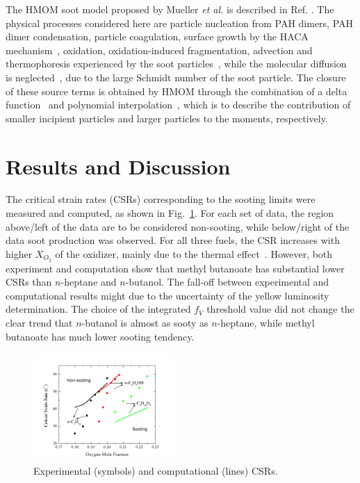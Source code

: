 \documentclass[preprint,3p,times,twocolumn]{elsarticleUS}
\begin{document}
The HMOM soot model proposed by Mueller \emph{et al.} is described in Ref. \cite{mueller09a,mueller09b,mueller11a}. The physical processes considered here are particle nucleation from PAH dimers, PAH dimer condensation, particle coagulation, surface growth by the HACA mechanism~\cite{frenklach02,frenklach91}, oxidation, oxidation-induced fragmentation, advection and thermophoresis experienced by the soot particles~\cite{waldmann66}, while the molecular diffusion is neglected~\cite{bisetti11}, due to the large Schmidt number of the soot particle. The closure of these source terms is obtained by HMOM through the combination of a delta function~\cite{marchisio05} and polynomial interpolation~\cite{frenklach87}, which is to describe the contribution of smaller incipient particles and larger particles to the moments, respectively.        


\section{Results and Discussion}

The critical strain rates (CSRs) corresponding to the sooting limits were measured and computed, as shown in Fig.~\ref{fig:Exp-Comp}. For each set of data, the region above/left of the data are to be considered non-sooting, while below/right of the data soot production was observed. For all three fuels, the CSR increases with higher $X_{O_2}$ of the oxidizer, mainly due to the thermal effect~\cite{du91}. However, both experiment and computation show that methyl butanoate has substantial lower CSRs than $n$-heptane and $n$-butanol. The fall-off between experimental and computational results might due to the uncertainty of the yellow luminosity determination. The choice of the integrated $f_V$ threshold value did not change the clear trend that $n$-butanol is almost as sooty as $n$-heptane, while methyl butanoate has much lower sooting tendency.

\begin{figure}[h]
  \centering
  \scriptsize
  \vspace{-0.1in}
  \includegraphics[width=0.48\textwidth]{Exp-Comp.png}
  \normalsize
  \vspace{-0.2in}
  \caption{Experimental (symbols) and computational (lines) CSRs. }
  \label{fig:Exp-Comp}
\end{figure}
\end{document}
